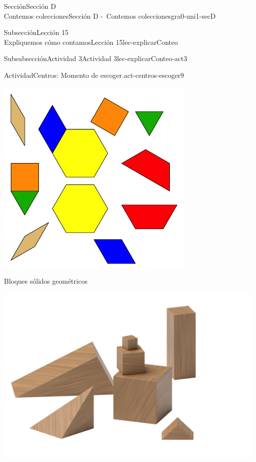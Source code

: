 \begin{sectionptx}{Sección}{{\Large Sección D\\}Contemos colecciones}{}{Sección D -~Contemos colecciones}{}{}{gra0-uni1-secD}
\begin{subsectionptx}{Subsección}{{\normalsize Lección 15\\[-0.05cm]}Expliquemos cómo contamos}{}{Lección 15}{}{}{lec-explicarConteo}
\begin{subsubsectionptx}{Subsubsección}{Actividad 3}{}{Actividad 3}{}{}{lec-explicarConteo-act3}
\begin{activity}{Actividad}{Centros: Momento de escoger.}{act-centros-escoger9}
\begin{sidebyside}{2}{0.025}{0.025}{0.05}
\begin{sbspanel}{0.45}
\includegraphics[max width=\linewidth, center]{external/svg-source/tikz-file-147344.pdf}
\end{sbspanel}%
\end{sidebyside}%
\begin{sidebyside}{2}{0.025}{0.025}{0.05}%
\begin{sbspanel}{0.45}%
Bloques sólidos geométricos%
\par
\includegraphics[max width=\linewidth, center]{external/png-source/K.1.A Beta Student Workbook.Geoblocks.png}
\end{sbspanel}%

\end{sidebyside}
\end{activity}
\end{subsubsectionptx}
\end{subsectionptx}
\end{sectionptx}
